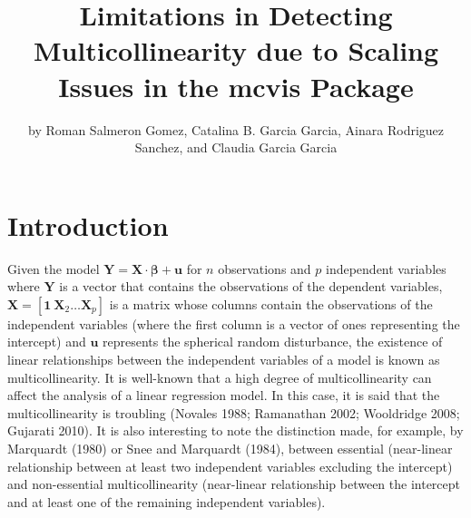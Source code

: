 \title{Limitations in Detecting Multicollinearity due to Scaling Issues in the mcvis Package}
\author{by Roman Salmeron Gomez, Catalina B. Garcia Garcia, Ainara Rodriguez Sanchez, and Claudia Garcia Garcia}

\maketitle


\hypertarget{introduction}{%
\section{Introduction}\label{introduction}}

Given the model \(\mathbf{Y} = \mathbf{X} \cdot \boldsymbol{\beta} + \mathbf{u}\) for \(n\) observations and \(p\) independent variables where \(\mathbf{Y}\) is a vector that contains the observations of the dependent variables, \(\mathbf{X} = [\mathbf{1} \ \mathbf{X}_{2} \dots \mathbf{X}_{p}]\) is a matrix whose columns contain the observations of the independent variables (where the first column is a vector of ones representing the intercept) and \(\mathbf{u}\) represents the spherical random disturbance, the existence of linear relationships between the independent variables of a model is known as multicollinearity. It is well-known that a high degree of multicollinearity can affect the analysis of a linear regression model. In this case, it is said that the multicollinearity is troubling (Novales 1988; Ramanathan 2002; Wooldridge 2008; Gujarati 2010). It is also interesting to note the distinction made, for example, by Marquardt (1980) or Snee and Marquardt (1984), between essential (near-linear relationship between at least two independent variables excluding the intercept) and non-essential multicollinearity (near-linear relationship between the intercept and at least one of the remaining independent variables).

